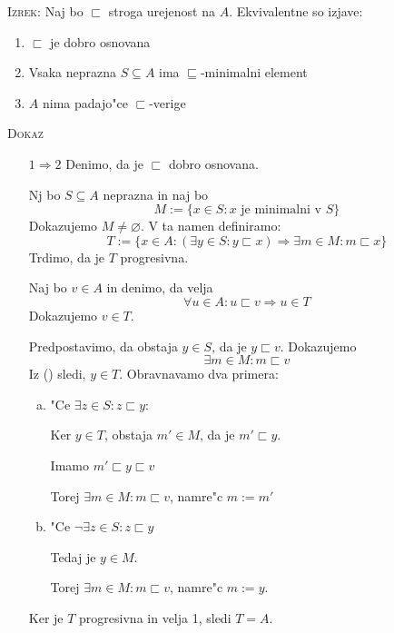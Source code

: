 \textsc{Izrek:} Naj bo $\sqsubset$ stroga urejenost na $A$. Ekvivalentne so izjave:
\begin{enumerate}
	\item $\sqsubset$ je dobro osnovana
	\item Vsaka neprazna $S \subseteq A$ ima $\sqsubseteq$-minimalni element
	\item $A$ nima padajo"ce $\sqsubset$-verige
\end{enumerate}
\textsc{Dokaz}
\begin{itemize}
	\item[$1 \Rightarrow 2$] Denimo, da je $\sqsubset$ dobro osnovana.
	
	Nj bo $S \subseteq A$ neprazna in naj bo 
	\begin{equation*}
	M := \{x \in S: x \text{ je minimalni v $S$}\}
	\end{equation*}
	Dokazujemo $M \neq \varnothing$. V ta namen definiramo:
	\begin{equation*}
	T := \{x \in A: (\exists y \in S: y \sqsubset x) \Rightarrow \exists m \in M: m \sqsubset x\}
	\end{equation*}
	Trdimo, da je $T$ progresivna.
	
	Naj bo $v \in A$ in denimo, da velja
	\begin{equation*}
	\forall u \in A: u \sqsubset v \Rightarrow u \in T \tag{\hexstar}
	\end{equation*}
	Dokazujemo $v \in T$.
	
	Predpostavimo, da obstaja $y \in S$, da je $y \sqsubset v$. Dokazujemo
	\begin{equation*}
	\exists m \in M: m \sqsubset v
	\end{equation*}
	Iz (\hexstar) sledi, $y \in T$. Obravnavamo dva primera:
	\begin{enumerate}[(a)]
		\item "Ce $\exists z \in S: z \sqsubset y$:
		
		Ker $y \in T$, obstaja $m' \in M$, da je $m' \sqsubset y$.
		
		Imamo $m' \sqsubset y \sqsubset v$
		
		Torej $\exists m \in M: m \sqsubset v$, namre"c $m := m'$
		
		\item "Ce $\lnot \exists z \in S: z \sqsubset y$
		
		Tedaj je $y \in M$.
		
		Torej $\exists m \in M: m \sqsubset v$, namre"c $m := y$.
	\end{enumerate}
	Ker je $T$ progresivna in velja 1, sledi $T = A$.
	

\end{itemize}
